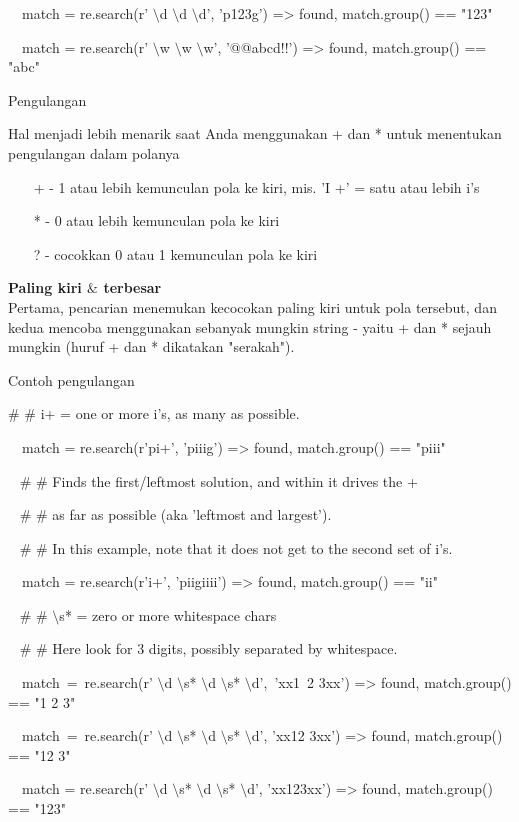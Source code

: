 \begin {enumerate}
\begin {enumerate}
~~match = re.search(r' $  \setminus  $d $  \setminus  $d $  \setminus  $d', 'p123g') =>  found, match.group() == "123"

~~match = re.search(r' $  \setminus  $w $  \setminus  $w $  \setminus  $w', '@@abcd!!') =>  found, match.group() == "abc"

Pengulangan

Hal menjadi lebih menarik saat Anda menggunakan + dan * untuk menentukan pengulangan dalam polanya

~~~ + - 1 atau lebih kemunculan pola ke kiri, mis. 'I +' = satu atau lebih i's

~~~ * - 0 atau lebih kemunculan pola ke kiri

~~~ ? - cocokkan 0 atau 1 kemunculan pola ke kiri

{\fontsize{14pt}{14pt}\selectfont \textbf{Paling kiri  $  \&  $ terbesar} \\}
Pertama, pencarian menemukan kecocokan paling kiri untuk pola tersebut, dan kedua mencoba menggunakan sebanyak mungkin string - yaitu + dan * sejauh mungkin (huruf + dan * dikatakan "serakah").

Contoh pengulangan

 $  \#  $ $  \#  $ i+ = one or more i's, as many as possible.

~~match = re.search(r'pi+', 'piiig') =>  found, match.group() == "piii"

~  $  \#  $ $  \#  $ Finds the first/leftmost solution, and within it drives the +

~  $  \#  $ $  \#  $ as far as possible (aka 'leftmost and largest').

~  $  \#  $ $  \#  $ In this example, note that it does not get to the second set of i's.

~~match = re.search(r'i+', 'piigiiii') =>  found, match.group() == "ii"

~  $  \#  $ $  \#  $  $  \setminus  $s* = zero or more whitespace chars

~  $  \#  $ $  \#  $ Here look for 3 digits, possibly separated by whitespace.

~~match~=~re.search(r' $  \setminus  $d $  \setminus  $s* $  \setminus  $d $  \setminus  $s* $  \setminus  $d',~'xx1~2   3xx') =>  found, match.group() == "1 2   3"

~~match~=~re.search(r' $  \setminus  $d $  \setminus  $s* $  \setminus  $d $  \setminus  $s* $  \setminus  $d', 'xx12  3xx') =>  found, match.group() == "12  3"

~~match = re.search(r' $  \setminus  $d $  \setminus  $s* $  \setminus  $d $  \setminus  $s* $  \setminus  $d', 'xx123xx') =>  found, match.group() == "123"


\end{enumerate}
\end{enumerate}
